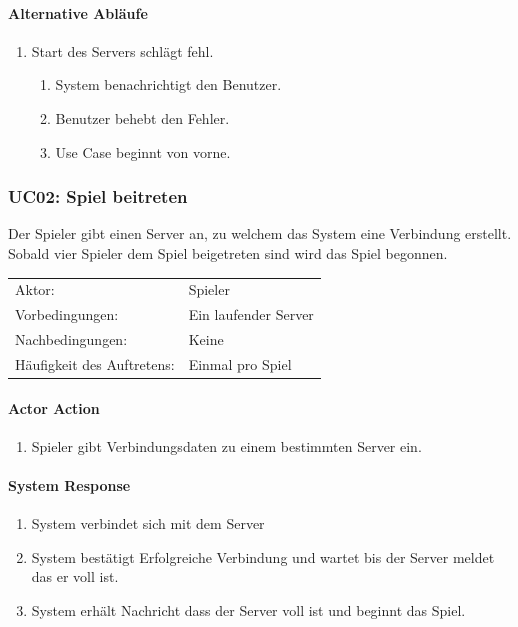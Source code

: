 \documentclass[a4paper,12pt,halfparskip,DIV14]{scrartcl}
\begin{document}
\paragraph{Alternative Abläufe}
\begin{enumerate}
	\item[2a] Start des Servers schlägt fehl.
	\begin{enumerate}
		\item System benachrichtigt den Benutzer.
		\item Benutzer behebt den Fehler.
		\item Use Case beginnt von vorne.
	\end{enumerate}
\end{enumerate}

\subsubsection{UC02: Spiel beitreten}\label{ssub:uc02_spiel_beitreten}
Der Spieler gibt einen Server an, zu welchem das System  eine Verbindung erstellt. Sobald vier Spieler dem Spiel beigetreten sind wird das Spiel begonnen.

\begin{tabular}{@{} l l @{}}
	Aktor:       								&	Spieler \\
	Vorbedingungen:							& Ein laufender Server \\
	Nachbedingungen:						& Keine \\
	Häufigkeit des Auftretens:	& Einmal pro Spiel \\
\end{tabular}

\vspace{0.5cm}

\begin{multicols}{2}
\raggedcolumns
\paragraph{Actor Action}
\begin{enumerate}
	\item[1] Spieler gibt Verbindungsdaten zu einem bestimmten Server ein.
\end{enumerate}
\columnbreak
\paragraph{System Response}
\begin{enumerate}
	\item[2] System verbindet sich mit dem Server
	\item[3] System bestätigt Erfolgreiche Verbindung und wartet bis der Server meldet das er voll ist.
	\item[4] System erhält Nachricht dass der Server voll ist und beginnt das Spiel.
\end{enumerate}
\end{multicols}
\end{document}
